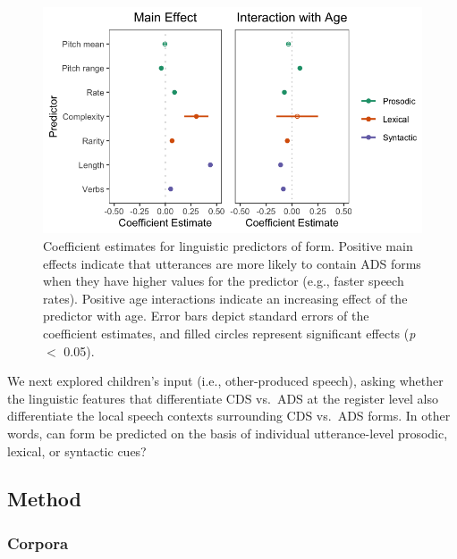 \documentclass[10pt, letterpaper]{article}
\newenvironment{CodeChunk}{}{}
\begin{document}
\begin{CodeChunk}
\begin{figure}[h]

{\centering \includegraphics{figs/model-plot-1} 

}

\caption[Coefficient estimates for linguistic predictors of form]{Coefficient estimates for linguistic predictors of form. Positive main effects indicate that utterances are more likely to contain ADS forms when they have higher values for the predictor (e.g., faster speech rates). Positive age interactions indicate an increasing effect of the predictor with age. Error bars depict standard errors of the coefficient estimates, and filled circles represent significant effects (\textit{p} $<$ 0.05).}\label{fig:model-plot}
\end{figure}
\end{CodeChunk}

We next explored children's input (i.e., other-produced speech), asking
whether the linguistic features that differentiate CDS vs.~ADS at the
register level also differentiate the local speech contexts surrounding
CDS vs.~ADS forms. In other words, can form be predicted on the basis of
individual utterance-level prosodic, lexical, or syntactic cues?

\hypertarget{method-1}{%
\subsection{Method}\label{method-1}}

\hypertarget{corpora-1}{%
\subsubsection{Corpora}\label{corpora-1}}
\end{document}
